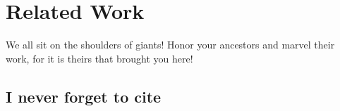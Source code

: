 \documentclass[thesis.tex]{subfiles}
\begin{document}
\chapter{Related Work}\label{chap:prevwork}

We all sit on the shoulders of giants! Honor your ancestors and marvel their work, for it is theirs that brought you here!

\section{I never forget to cite}
\cite{bib:Entry}


\subfilebib %
\end{document}
